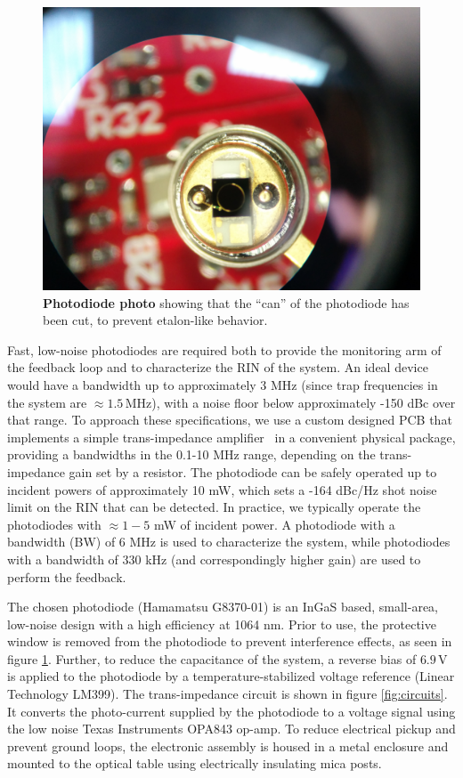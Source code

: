 \documentclass[twocolumn,aps,pra,showpacs,preprintnumbers,bibnotes]{revtex4-1}
\begin{document}
\begin{figure}
  \begin{center}
    \includegraphics[width=\columnwidth]{fig/cut_photodiode.jpg}
    \caption{\textbf{Photodiode photo} showing that the ``can'' of the photodiode has been cut, to prevent etalon-like behavior.}\label{fig:cut_pd}
  \end{center}
\end{figure}

Fast, low-noise photodiodes are required both to provide the monitoring arm of the feedback loop and to characterize the RIN of the system.
An ideal device would have a bandwidth up to approximately 3 MHz (since trap frequencies in the system are $\approx1.5\,$MHz), with a noise floor below approximately -150 dBc over that range.
To approach these specifications, we use a custom designed PCB that implements a simple trans-impedance amplifier~\cite{Graeme1995} in a convenient physical package, providing a bandwidths in the 0.1-10 MHz range, depending on the trans-impedance gain set by a resistor. 
The photodiode can be safely operated up to incident powers of approximately 10 mW, which sets a -164 dBc/Hz shot noise limit on the RIN that can be detected. 
In practice, we typically operate the photodiodes with $\approx 1-5$ mW of incident power.
A photodiode with a bandwidth (BW) of 6 MHz is used to characterize the system, while photodiodes with a bandwidth of 330 kHz (and correspondingly higher gain) are used to perform the feedback.

The chosen photodiode (Hamamatsu G8370-01) is an InGaS based, small-area, low-noise design with a high efficiency at 1064 nm.
Prior to use, the protective window is removed from the photodiode to prevent interference effects, as seen in figure \ref{fig:cut_pd}.
Further, to reduce the capacitance of the system, a reverse bias of $6.9\,$V is applied to the photodiode by a temperature-stabilized voltage reference (Linear Technology LM399).
The trans-impedance circuit is shown in figure \ref{fig:circuits}. 
It converts the photo-current supplied by the photodiode to a voltage signal using the low noise Texas Instruments OPA843 op-amp. 
To reduce electrical pickup and prevent ground loops, the electronic assembly is housed in a metal enclosure and mounted to the optical table using electrically insulating mica posts. 
\end{document}
